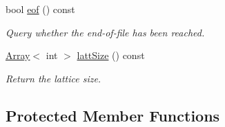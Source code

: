 \begin{DoxyCompactItemize}
bool \mbox{\hyperlink{group__qio_ga22337f3cfe1b2ecd1ead8d2755a1f9ca}{eof}} () const
\begin{DoxyCompactList}\small\item\em Query whether the end-\/of-\/file has been reached. \end{DoxyCompactList}\item 
\mbox{\hyperlink{classXMLArray_1_1Array}{Array}}$<$ int $>$ \mbox{\hyperlink{group__qio_ga3498ab9948d446056dee8f2808e05c78}{latt\+Size}} () const
\begin{DoxyCompactList}\small\item\em Return the lattice size. \end{DoxyCompactList}\end{DoxyCompactItemize}
\subsection*{Protected Member Functions}
